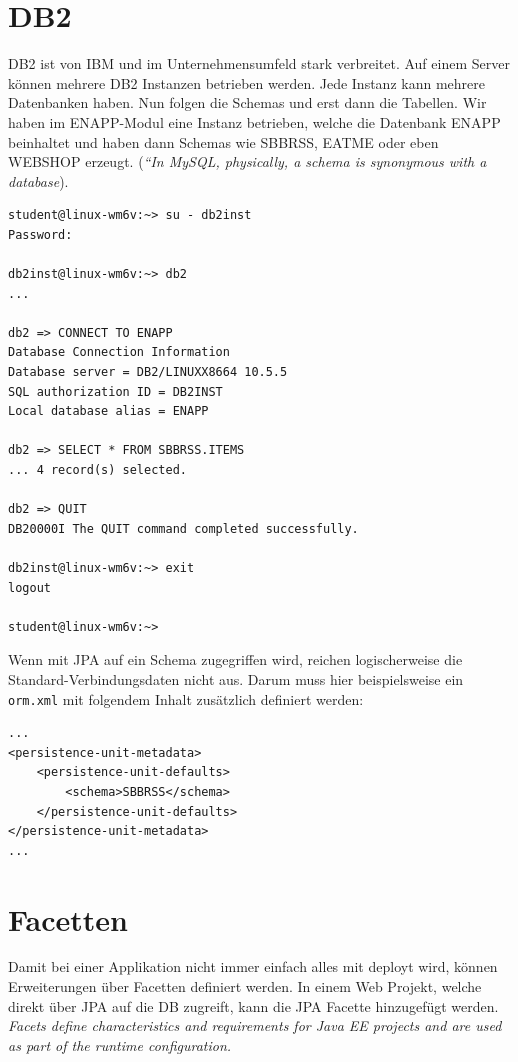 \section{DB2}
DB2 ist von IBM und im Unternehmensumfeld stark verbreitet. Auf einem Server können mehrere DB2 Instanzen betrieben werden. Jede Instanz kann mehrere Datenbanken haben. Nun folgen die Schemas und erst dann die Tabellen. Wir haben im ENAPP-Modul eine Instanz betrieben, welche die Datenbank ENAPP beinhaltet und haben dann Schemas wie SBBRSS, EATME oder eben WEBSHOP erzeugt. (\emph{“In MySQL, physically, a schema is synonymous with a database}).

\begin{lstlisting}
student@linux-wm6v:~> su - db2inst
Password:

db2inst@linux-wm6v:~> db2
...

db2 => CONNECT TO ENAPP
Database Connection Information
Database server = DB2/LINUXX8664 10.5.5
SQL authorization ID = DB2INST
Local database alias = ENAPP

db2 => SELECT * FROM SBBRSS.ITEMS
... 4 record(s) selected.

db2 => QUIT
DB20000I The QUIT command completed successfully.

db2inst@linux-wm6v:~> exit
logout

student@linux-wm6v:~>
\end{lstlisting}

Wenn mit JPA auf ein Schema zugegriffen wird, reichen logischerweise die Standard-Verbindungsdaten nicht aus. Darum muss hier beispielsweise ein \verb|orm.xml| mit folgendem Inhalt zusätzlich definiert werden:

\begin{lstlisting}
...
<persistence-unit-metadata>
	<persistence-unit-defaults>
		<schema>SBBRSS</schema>
	</persistence-unit-defaults>
</persistence-unit-metadata>
...
\end{lstlisting}

\section{Facetten}
Damit bei einer Applikation nicht immer einfach alles mit deployt wird, können Erweiterungen über Facetten definiert werden. In einem Web Projekt, welche direkt über JPA auf die DB zugreift, kann die JPA Facette hinzugefügt werden. \emph{Facets define characteristics and requirements for Java EE projects and are used as part of the runtime configuration.}




